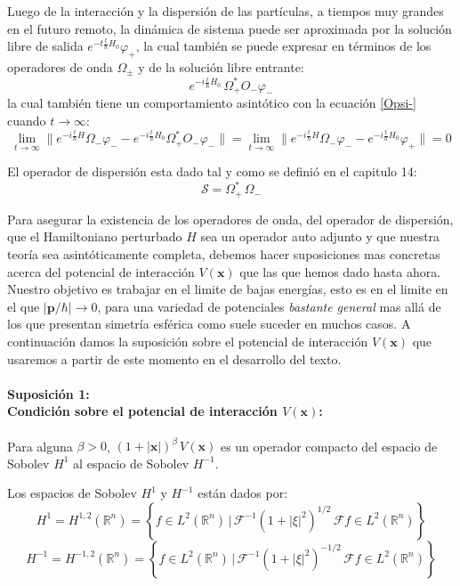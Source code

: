 \documentclass[12pt]{book}
\numberwithin{equation}{chapter}
\def\R{\mathbb{R}}
\def\S{\mathcal{S}}
\def\rar{\rightarrow}
\def\F{\mathcal{F}}
\def\x{\mathbf{x}}
\def\P{\mathbf{p}}
\def\O{\Omega}
\begin{document}
Luego de la interacci\'on y la dispersi\'on de las part\'iculas, a tiempos muy grandes en el futuro remoto, la din\'amica de sistema puede ser aproximada por la soluci\'on libre de salida $e^{-t\frac{t}{\hbar}H_{0}} \varphi_{+}$, la cual tambi\'en se puede expresar en t\'erminos de los operadores de onda $\O_{\pm}$ y de la soluci\'on libre entrante:
$$ e^{ -i\frac{t}{\hbar}H_{0}} \, \O_{+}^{*} O_{-} \varphi_{-} $$
la cual tambi\'en tiene un comportamiento asint\'otico con la ecuaci\'on \eqref{Opsi-} cuando $t\rar \infty$:
$$ \lim_{t \rar \infty} \| e^{-i\frac{t}{\hbar}H} \O_{-} \varphi_{-} - e^{-i \frac{t}{\hbar}H_{0} } \O_{+}^{*} O_{-} \varphi_{-} \| = \lim_{t \rar \infty} \| e^{-i\frac{t}{\hbar}H} \O_{-} \varphi_{-} - e^{-i \frac{t}{\hbar}H_{0} } \varphi_{+} \|=0 $$

El operador de dispersi\'on esta dado tal y como se defini\'o en el capitulo 14:
$$ \S= \O_{+}^{*}\, \O_{-} $$

Para asegurar la existencia de los operadores de onda, del operador de dispersi\'on, que el Hamiltoniano perturbado $H$ sea un operador auto adjunto y que nuestra teor\'ia sea asint\'oticamente completa, debemos hacer suposiciones mas concretas acerca del potencial de interacci\'on $V(\x)$ que las que hemos dado hasta ahora. Nuestro objetivo es trabajar en el limite de bajas energ\'ias, esto es en el limite en el que $|\P / \hbar| \rar 0$, para una variedad de potenciales \emph{bastante general} mas all\'a de los que presentan simetr\'ia esf\'erica como suele suceder en muchos casos. A continuaci\'on damos la suposici\'on sobre el potencial de interacci\'on $V(\x)$ que usaremos a partir de este momento en el desarrollo del texto.

\paragraph{Suposici\'on 1:\\ Condici\'on sobre el potencial de interacci\'on $V(\x)$:}

Para alguna $\beta >0$, $(1+|\x|)^{\beta} \, V(\x)$ es un operador compacto del espacio de Sobolev $H^{1}$ al espacio de Sobolev $H^{-1}$.\\
\rightline{$\dag$}
\vspace{3 mm}

Los espacios de Sobolev $H^{1}$ y $H^{-1}$ est\'an dados por:
$$ H^{1}= H^{1,2}(\R^{n}) = \left\{ f \in L^{2}(\R^{n}) \,|\, \F^{-1} (1+ |\xi|^{2})^{1/2} \,\F f \in L^{2}(\R^{n}) \right\}$$
$$ H^{-1}= H^{-1,2}(\R^{n}) = \left\{ f \in L^{2}(\R^{n}) \,|\, \F^{-1} (1+ |\xi|^{2})^{-1/2} \,\F f \in L^{2}(\R^{n}) \right\}$$
\end{document}
